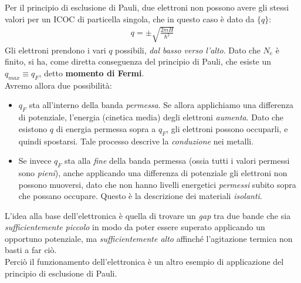 \documentclass[../../FisicaTeorica.tex]{subfiles}
\begin{document}
Per il principio di esclusione di Pauli, due elettroni non possono avere gli stessi valori per un ICOC di particella singola, che in questo caso è dato da $\{q\}$:
\begin{align*}
q = \pm \sqrt{\frac{2mH}{\hbar^2}}
\end{align*}
Gli elettroni prendono i vari $q$ possibili, \textit{dal basso verso l'alto}. Dato che $N_e$ è finito, si ha, come diretta conseguenza del principio di Pauli, che esiste un $q_{max} \equiv q_F$, detto \textbf{momento di Fermi}.\\
Avremo allora due possibilità:
\begin{itemize}
\item $q_F$ sta all'interno della banda \textit{permessa}. Se allora applichiamo una differenza di potenziale, l'energia (cinetica media) degli elettroni \textit{aumenta}. Dato che esistono $q$ di energia permessa sopra a $q_F$, gli elettroni possono occuparli, e quindi spostarsi. Tale processo descrive la \textit{conduzione} nei metalli.
\item Se invece $q_F$ sta alla \textit{fine} della banda permessa (ossia tutti i valori permessi sono \textit{pieni}), anche applicando una differenza di potenziale gli elettroni non possono muoversi, dato che non hanno livelli energetici \textit{permessi} subito sopra che possano occupare. Questo è la descrizione dei materiali \textit{isolanti}.
\end{itemize}

L'idea alla base dell'elettronica è quella di trovare un \textit{gap} tra due bande che sia \textit{sufficientemente piccolo} in modo da poter essere superato applicando un opportuno potenziale, ma \textit{sufficientemente alto} affinché l'agitazione termica non basti a far ciò.\\
Perciò il funzionamento dell'elettronica è un altro esempio di applicazione del principio di esclusione di Pauli.
\end{document}
